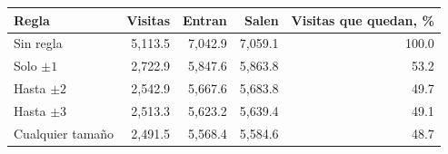 \begin{tabular}{@{}lrrrr@{}}
\toprule
Regla & Visitas & Entran & Salen & Visitas que quedan, \% \\
\midrule
Sin regla & 5,113.5 & 7,042.9 & 7,059.1 & 100.0 \\
Solo $\pm1$ & 2,722.9 & 5,847.6 & 5,863.8 & 53.2 \\
Hasta $\pm2$ & 2,542.9 & 5,667.6 & 5,683.8 & 49.7 \\
Hasta $\pm3$ & 2,513.3 & 5,623.2 & 5,639.4 & 49.1 \\
Cualquier tamaño & 2,491.5 & 5,568.4 & 5,584.6 & 48.7 \\
\bottomrule
\end{tabular}
